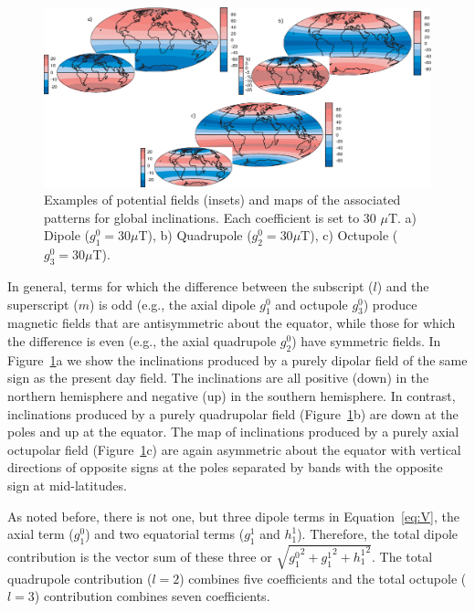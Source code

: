  \begin{figure}[htb]
\centering  \includegraphics[width=14.5 cm]{EPSfiles/harmonics.eps}
\caption{Examples of potential fields (insets)  and maps of  the associated patterns for global inclinations.  Each coefficient is set to 30 $\mu$T.   a) Dipole ($g_1^0=30 \mu$T), b) Quadrupole ($g_2^0=30 \mu$T), c) Octupole ($g_3^0=30 \mu$T).    }
\label{fig:harmonics}
\end{figure}


  In general, terms for which the difference between the subscript ($l$) and the superscript ($m$) is odd (e.g., the axial dipole $g_1^0$ and octupole $g_3^0$)  produce magnetic fields that are antisymmetric about the equator, while those for which the difference is even (e.g., the axial quadrupole $g_2^0$) have symmetric fields.  In Figure~\ref{fig:harmonics}a we show the inclinations produced by a purely dipolar field of the same sign as the present day field.  The inclinations are all positive (down) in the northern hemisphere and negative (up) in the southern hemisphere.  In contrast, inclinations produced by a purely quadrupolar field (Figure~\ref{fig:harmonics}b) are down at the poles and up at the equator.    The map of inclinations produced by a purely axial octupolar field (Figure~\ref{fig:harmonics}c) are again asymmetric about the equator  with  vertical directions of opposite signs at the poles separated by bands with the opposite sign at mid-latitudes.    

As noted before, there is not one, but three dipole terms in Equation~\ref{eq:V},   the axial term ($g_1^0$) and two equatorial terms ($g_1^1$ and $h_1^1$).  
Therefore, the total dipole contribution is the vector sum of these three or $\sqrt{{g_1^0}^2+{g_1^1}^2+{h_1^1}^2}$.   The total quadrupole contribution ($l=2$) combines five coefficients and the total octupole ($l=3$)  contribution combines seven coefficients.  
 




